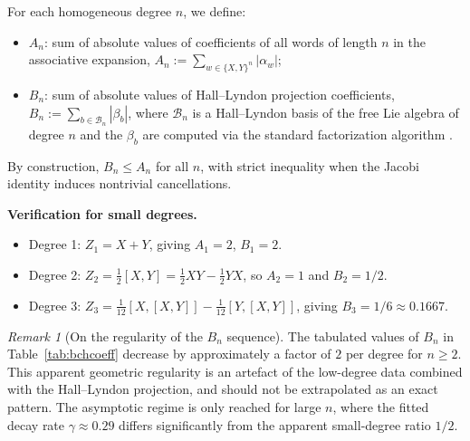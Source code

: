 \documentclass[10pt]{amsart}
\theoremstyle{definition}
\theoremstyle{remark}
\newtheorem{remark}[theorem]{Remark}
\numberwithin{equation}{section}
\begin{document}
For each homogeneous degree $n$, we define:
\begin{itemize}
    \item $A_n$: sum of absolute values of coefficients of all words of length $n$ in the
          associative expansion,
          $A_n := \sum_{w \in \{X,Y\}^n} |\alpha_w|$;
    \item $B_n$: sum of absolute values of Hall--Lyndon projection coefficients,
          $B_n := \sum_{b \in \mathcal{B}_n} |\beta_b|$,
          where $\mathcal{B}_n$ is a Hall--Lyndon basis of the free Lie algebra of degree
          $n$ and the $\beta_b$ are computed via the standard factorization algorithm
          \cite{Reutenauer1993}.
\end{itemize}
By construction, $B_n \le A_n$ for all $n$, with strict inequality when the Jacobi
identity induces nontrivial cancellations.

\textbf{Verification for small degrees.}
\begin{itemize}
\item Degree 1: $Z_1 = X + Y$, giving $A_1 = 2$, $B_1 = 2$.
\item Degree 2: $Z_2 = \frac{1}{2}[X,Y] = \frac{1}{2}XY - \frac{1}{2}YX$, so
      $A_2 = 1$ and $B_2 = 1/2$.
\item Degree 3: $Z_3 = \frac{1}{12}[X,[X,Y]] - \frac{1}{12}[Y,[X,Y]]$,
      giving $B_3 = 1/6 \approx 0.1667$.
\end{itemize}

\begin{remark}[On the regularity of the $B_n$ sequence]\label{rem:Bn-regularity}
The tabulated values of $B_n$ in Table~\ref{tab:bchcoeff} decrease by approximately a
factor of $2$ per degree for $n\ge 2$.  This apparent geometric regularity is an artefact
of the low-degree data combined with the Hall--Lyndon projection, and should not be
extrapolated as an exact pattern.  The asymptotic regime is only reached for large $n$,
where the fitted decay rate $\gamma \approx 0.29$ differs significantly from the apparent
small-degree ratio $1/2$.
\end{remark}
\end{document}
